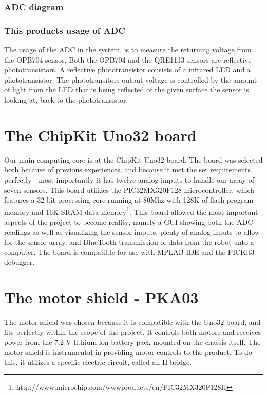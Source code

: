 \subsubsection{ADC diagram} 

\subsubsection{This products usage of ADC}
The usage of the ADC in the system, is to measure the returning voltage from the OPB704 sensor. Both the OPB704 and the QRE1113 sensors are reflective phototransistors.
A reflective phototransistor consists of a infrared LED and a phototransistor.
The phototransitors output voltage is controlled by the amount of light from the LED that is being reflected of the given surface the sensor is looking at, back to the phototransistor.

\section{The ChipKit Uno32 board}
Our main computing core is at the ChipKit Uno32 board. The board was selected both because of previous experiences, and because it met the set requirements perfectly - most importantly it has twelve analog imputs to handle our array of seven sensors. This board utilizes the PIC32MX320F128 microcontroller, which features a 32-bit processing core running at 80Mhz with 128K of flash program memory and 16K SRAM data memory\footnote{http://www.microchip.com/wwwproducts/en/PIC32MX320F128H}. This board allowed the most important aspects of the project to become reality; namely a GUI showing both the ADC readings as well as visualizing the sensor imputs, plenty of analog inputs to allow for the sensor array, and BlueTooth transmission of data from the robot unto a computer.\newline
The board is compatible for use with MPLAB IDE and the PICKit3 debugger.

\section{The motor shield - PKA03}
The motor shield was chosen because it is compatible with the Uno32 board, and fits perfectly within the scope of the project. It controls both motors and receives power from the 7.2 V lithium-ion battery pack mounted on the chassis itself. The motor shield is instrumental in providing motor controls to the product. To do this, it utilizes a specific electric circuit, called an H bridge.

